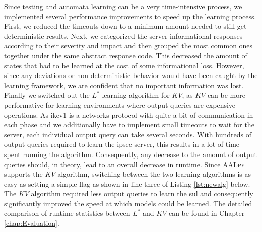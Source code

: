 Since testing and automata learning can be a very time-intensive process, we implemented several performance improvements to speed up the learning process. First, we reduced the timeouts down to a minimum amount needed to still get deterministic results. Next, we categorized the server informational responses according to their severity and impact and then grouped the most common ones together under the same abstract response code. This decreased the amount of states that had to be learned at the cost of some informational loss. However, since any deviations or non-deterministic behavior would have been caught by the learning framework, we are confident that no important information was lost. Finally we switched out the $L^*$ learning algorithm for $KV$, as $KV$ can be more performative for learning environments where output queries are expensive operations. As \ac{ike}v1 is a networks protocol with quite a bit of communication in each phase and we additionally have to implement small timeouts to wait for the server, each individual output query can take several seconds. With hundreds of output queries required to learn the \ac{ipsec} server, this results in a lot of time spent running the algorithm. Consequently, any decrease to the amount of output queries should, in theory, lead to an overall decrease in runtime. Since \textsc{AALpy} supports the $KV$ algorithm, switching between the two learning algorithms is as easy as setting a simple flag as shown in line three of Listing \ref{lst:newalg} below. The $KV$ algorithm required less output queries to learn the \ac{sul} and consequently significantly improved the speed at which models could be learned. The detailed comparison of runtime statistics between $L^*$ and $KV$ can be found in Chapter \ref{chap:Evaluation}.

